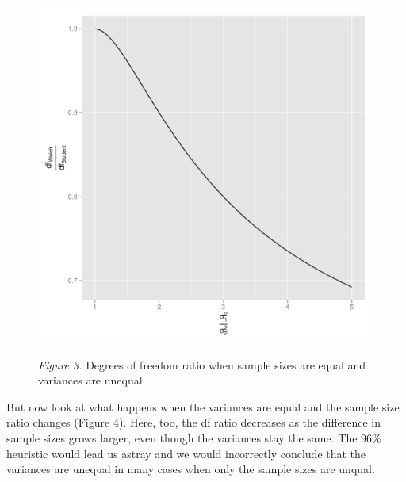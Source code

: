 \documentclass[man,a4paper,noextraspace,apacite]{apa6}\usepackage[]{graphicx}\usepackage[]{color}
\makeatletter
\def\maxwidth{ %
  \ifdim\Gin@nat@width>\linewidth
    \linewidth
  \else
    \Gin@nat@width
  \fi
}
\newenvironment{knitrout}{}{} %
\makeatother
\begin{document}
\begin{figure}
\begin{knitrout}
\color{fgcolor}
\includegraphics[width=\maxwidth]{figure/dfratiosDiffvars} 

\end{knitrout}
\textit{Figure 3.} Degrees of freedom ratio when sample sizes are equal and variances are unequal.
\end{figure}

    But now look at what happens when the variances are equal and the sample size ratio changes (Figure 4). Here, too, the df ratio decreases as the difference in sample sizes grows larger, even though the variances stay the same. The 96\% heuristic would lead us astray and we would incorrectly conclude that the variances are unequal in many cases when only the sample sizes are unqual.
\end{document}
